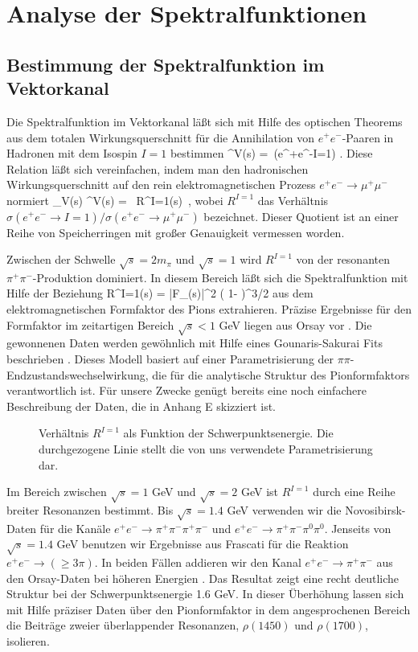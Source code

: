 \chapter{Analyse der Spektralfunktionen}
\section{Bestimmung der Spektralfunktion im Vektorkanal}
Die Spektralfunktion im Vektorkanal l\"a\ss t sich mit Hilfe 
des optischen Theorems aus dem totalen Wirkungsquerschnitt
f\"ur die Annihilation von $e^+e^-$-Paaren in Hadronen 
mit dem Isospin $I=1$ bestimmen
\be
\label{opttheo}
 \Pi^V(s) = 
   \,\sigma (e^+e^-\to I=1) .
\ee
Diese Relation l\"a\ss t sich vereinfachen, indem man den
hadronischen Wirkungsquerschnitt auf den rein     
elektromagnetischen Prozess $e^+e^-\to\mu^+\mu^-$
normiert
\be
\label{rhov}
 \rho_V(s) \equiv {}\Pi^V(s) =
       \, R^{I=1}(s)\, ,
\ee
wobei $R^{I=1}$ das Verh\"altnis $\sigma (e^+e^-\to I=1)/
\sigma (e^+e^-\to\mu^+\mu^-)$ bezeichnet. Dieser Quotient
ist an einer Reihe von Speicherringen mit gro\ss er 
Genauigkeit vermessen worden.

Zwischen der Schwelle $\sqrt s=2m_\pi$ und $\sqrt s=1$ wird
$R^{I=1}$ von der resonanten $\pi^+\pi^-$-Produktion dominiert.
In diesem Bereich l\"a\ss t sich die Spektralfunktion mit Hilfe
der Beziehung 
\be
 R^{I=1}(s) =  |F_\pi (s)|^2 \left( 
       1- \right)^{3/2}
\ee       
aus dem elektromagnetischen Formfaktor des Pions extrahieren. 
Pr\"azise Ergebnisse f\"ur den Formfaktor im zeitartigen Bereich 
$\sqrt s<1$ GeV liegen aus Orsay vor \cite{Que78}. Die gewonnenen 
Daten werden gew\"ohnlich mit Hilfe eines Gounaris-Sakurai Fits
beschrieben \cite{Hoe83}. Dieses Modell basiert auf einer 
Parametrisierung der $\pi\pi$-Endzustandswechselwirkung, die
f\"ur die analytische Struktur des Pionformfaktors verantwortlich ist.
F\"ur unsere Zwecke gen\"ugt bereits eine noch einfachere 
Beschreibung der Daten, die in Anhang E skizziert ist.
\begin{figure}
\caption{Verh\"altnis $R^{I=1}$ als Funktion der Schwerpunktsenergie. 
Die durchgezogene Linie stellt die von uns verwendete 
Parametrisierung dar.}
\vspace{8cm}
\end{figure}

Im Bereich zwischen  $\sqrt s=1$ GeV und $\sqrt s=2$ GeV ist 
$R^{I=1}$ durch eine Reihe breiter Resonanzen bestimmt. Bis
$\sqrt s=1.4$ GeV verwenden wir die Novosibirsk-Daten \cite{Sid76}
f\"ur die Kan\"ale $e^+e^-\to \pi^+\pi^-\pi^+\pi^-$ und $e^+e^-\to 
\pi^+\pi^-\pi^0\pi^0$. Jenseits von $\sqrt s=1.4$ GeV benutzen wir 
Ergebnisse aus Frascati \cite{Bac79} f\"ur die Reaktion $e^+e^-\to
(\ge 3\pi )$. In beiden F\"allen addieren wir den Kanal $e^+e^-\to\pi^+\pi^-$
aus den Orsay-Daten bei h\"oheren Energien \cite{Bis89}. Das Resultat 
zeigt eine recht deutliche Struktur bei der Schwerpunktsenergie 
1.6 GeV. In dieser \"Uberh\"ohung lassen sich mit Hilfe pr\"aziser
Daten \"uber den Pionformfaktor in dem angesprochenen Bereich die Beitr\"age
zweier \"uberlappender Resonanzen, $\rho(1450)$ und $\rho(1700)$, 
isolieren.  

